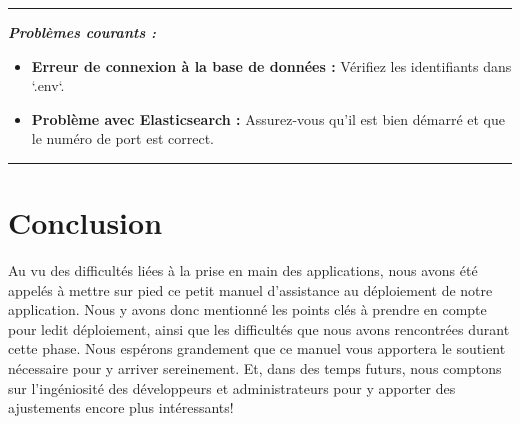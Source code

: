 \vspace{0.5cm}
\rule{\linewidth}{0.2pt}

{\fontsize{14}{16}\textbf{\textit{Problèmes courants :}}}

\begin{itemize}
    \item \textbf{Erreur de connexion à la base de données :} Vérifiez les identifiants dans `.env`.
    \item \textbf{Problème avec Elasticsearch :} Assurez-vous qu’il est bien démarré et que le numéro de port est correct.
\end{itemize}
\rule{\linewidth}{0.2pt}

\newpage
{\fontsize{14}{16}\section*{Conclusion}}
Au vu des difficultés liées à la prise en main des applications, nous avons été appelés à mettre sur pied ce petit manuel d'assistance au déploiement de notre application. Nous y avons donc mentionné les points clés à prendre en compte pour ledit déploiement, ainsi que les difficultés que nous avons rencontrées durant cette phase. Nous espérons grandement que ce manuel vous apportera le soutient nécessaire pour y arriver sereinement. Et, dans des temps futurs, nous comptons sur l'ingéniosité des développeurs et administrateurs pour y apporter des ajustements encore plus intéressants!
